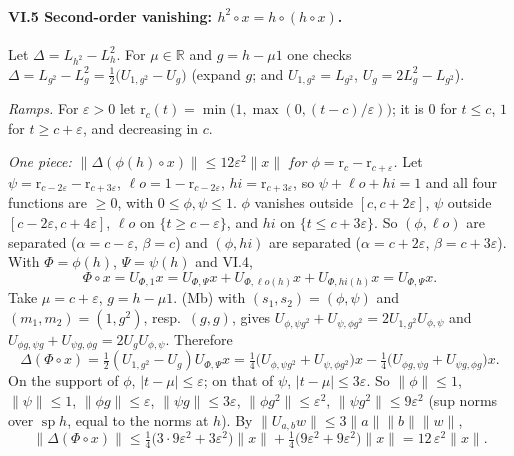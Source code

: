\documentclass[11pt]{article}
\theoremstyle{remark}
\newcommand{\jp}{\circ}
\DeclareMathOperator{\spec}{sp}
\begin{document}
\paragraph{VI.5 Second-order vanishing: $h^2\jp x = h\jp(h\jp x)$.}
Let $\Delta = L_{h^2}-L_h^2$. For $\mu\in\mathbb R$ and $g = h-\mu1$ one checks
$\Delta = L_{g^2}-L_g^2 = \tfrac12\bigl(U_{1,g^2} - U_g\bigr)$ (expand $g$; and
$U_{1,g^2} = L_{g^2}$, $U_g = 2L_g^2 - L_{g^2}$).

\emph{Ramps.} For $\varepsilon>0$ let $\mathrm r_c(t) = \min\bigl(1,\max(0,(t-c)/\varepsilon)\bigr)$;
it is $0$ for $t\le c$, $1$ for $t\ge c+\varepsilon$, and decreasing in $c$.

\emph{One piece: $\|\Delta(\phi(h)\jp x)\|\le12\varepsilon^2\|x\|$ for
$\phi = \mathrm r_c-\mathrm r_{c+\varepsilon}$.} Let $\psi = \mathrm r_{c-2\varepsilon}
-\mathrm r_{c+3\varepsilon}$, $\ell o = 1-\mathrm r_{c-2\varepsilon}$,
$hi = \mathrm r_{c+3\varepsilon}$, so $\psi+\ell o+hi = 1$ and all four functions are
$\ge0$, with $0\le\phi,\psi\le1$. $\phi$ vanishes outside $[c,c+2\varepsilon]$, $\psi$ outside
$[c-2\varepsilon,c+4\varepsilon]$, $\ell o$ on $\{t\ge c-\varepsilon\}$, and $hi$ on
$\{t\le c+3\varepsilon\}$. So $(\phi,\ell o)$ are separated ($\alpha = c-\varepsilon$,
$\beta = c$) and $(\phi,hi)$ are separated ($\alpha = c+2\varepsilon$, $\beta =
c+3\varepsilon$). With $\Phi = \phi(h)$, $\Psi = \psi(h)$ and VI.4,
\[
 \Phi\jp x = U_{\Phi,1}x = U_{\Phi,\Psi}x + U_{\Phi,\ell o(h)}x + U_{\Phi,hi(h)}x = U_{\Phi,\Psi}x.
\]
Take $\mu = c+\varepsilon$, $g = h-\mu1$. (Mb) with $(s_1,s_2) = (\phi,\psi)$ and
$(m_1,m_2) = (1,g^2)$, resp.\ $(g,g)$, gives
$U_{\phi,\psi g^2}+U_{\psi,\phi g^2} = 2U_{1,g^2}U_{\phi,\psi}$ and
$U_{\phi g,\psi g}+U_{\psi g,\phi g} = 2U_gU_{\phi,\psi}$. Therefore
\[
 \Delta(\Phi\jp x) = \tfrac12(U_{1,g^2}-U_g)U_{\Phi,\Psi}x
 = \tfrac14\bigl(U_{\phi,\psi g^2}+U_{\psi,\phi g^2}\bigr)x
 - \tfrac14\bigl(U_{\phi g,\psi g}+U_{\psi g,\phi g}\bigr)x .
\]
On the support of $\phi$, $|t-\mu|\le\varepsilon$; on that of $\psi$, $|t-\mu|\le
3\varepsilon$. So $\|\phi\|\le1$, $\|\psi\|\le 1$, $\|\phi g\|\le\varepsilon$,
$\|\psi g\|\le3\varepsilon$, $\|\phi g^2\|\le\varepsilon^2$, $\|\psi g^2\|\le 9\varepsilon^2$
(sup norms over $\spec h$, equal to the norms at $h$). By
$\|U_{a,b}w\|\le3\|a\|\|b\|\|w\|$,
\[
 \|\Delta(\Phi\jp x)\|\le\tfrac14\bigl(3\cdot9\varepsilon^2 + 3\varepsilon^2\bigr)\|x\|
 + \tfrac14\bigl(9\varepsilon^2+9\varepsilon^2\bigr)\|x\| = 12\,\varepsilon^2\|x\| .
\]
\end{document}
